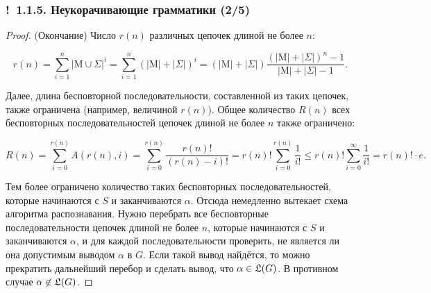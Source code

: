 \documentclass[mathserif,12pt,aspectratio=169]{beamer}
\let\leq\leqslant
\def\Ok{{\color{green}\textbf{!}\ }}
\begin{document}
\begin{frame}
\frametitle{\Ok 1.1.5. Неукорачивающие грамматики (2/5)}

\begin{proof} (Окончание)
Число $r(n)$  различных цепочек длиной не более
$n$:

\vspace{-12pt}
$$
r(n) = \sum_{i=1}^{n} \left|\mathrm{M}\cup \Sigma\right|^i
=\sum_{i=1}^n (|\mathrm{M}|+|\Sigma|)^i=
(|\mathrm{M}|+|\Sigma|)\frac{(|\mathrm{M}|+|\Sigma|)^n -1}{|\mathrm{M}|+|\Sigma| -1}.
$$

\vspace{-4pt}
Далее, длина бесповторной последовательности, составленной из
таких цепочек, также ограничена (например, величиной $r(n)$). Общее
количество $R(n)$ всех бесповторных последовательностей цепочек длиной не
более $n$ также ограничено:

\vspace{-16pt}
 $$R(n)=\sum_{i=0}^{r(n)} A(r(n),i) =
 \sum_{i=0}^{r(n)} \frac{r(n)!}{(r(n)-i)!}=
  r(n)!\sum_{i=0}^{r(n)}\frac{1}{i!}
  \leq r(n)!\sum_{i=0}^\infty\frac{1}{i!}
  =r(n)!\cdot e.$$ 

\vspace{-4pt}
Тем
более ограничено количество таких бесповторных
последовательностей, которые начинаются с $S$ и заканчиваются
$\alpha$.
Отсюда немедленно вытекает схема алгоритма распознавания. Нужно
перебрать все бесповторные последовательности цепочек длиной не
более $n$, которые начинаются с $S$ и заканчиваются $\alpha$, и для
каждой последовательности проверить, не является ли она допустимым
выводом $\alpha$ в $G$. 
Если такой вывод найдётся, то можно прекратить
дальнейший перебор и сделать вывод, что $\alpha\in \frak{L}(G)$. В
противном случае $\alpha\not\in \frak{L}(G)$.
\end{proof}
\end{frame}
\end{document}
